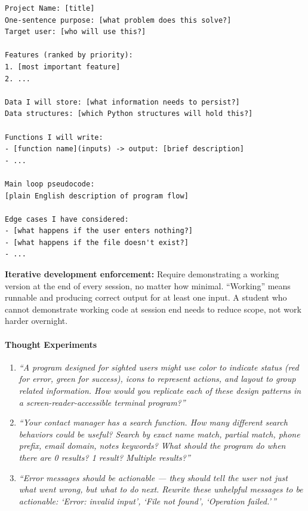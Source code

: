 \documentclass[
  justified,
  openright,
]{tufte-book}
\let\paragraph\paragraph
\let\paragraph\paragraph
\begin{document}
\begin{verbatim}
Project Name: [title]
One-sentence purpose: [what problem does this solve?]
Target user: [who will use this?]

Features (ranked by priority):
1. [most important feature]
2. ...

Data I will store: [what information needs to persist?]
Data structures: [which Python structures will hold this?]

Functions I will write:
- [function name](inputs) -> output: [brief description]
- ...

Main loop pseudocode:
[plain English description of program flow]

Edge cases I have considered:
- [what happens if the user enters nothing?]
- [what happens if the file doesn't exist?]
- ...
\end{verbatim}

\textbf{Iterative development enforcement:} Require demonstrating a
working version at the end of every session, no matter how minimal.
``Working'' means runnable and producing correct output for at least one
input. A student who cannot demonstrate working code at session end
needs to reduce scope, not work harder overnight.

\paragraph{Thought Experiments}\label{thought-experiments-17}

\begin{enumerate}
\def\labelenumi{\arabic{enumi}.}
\item
  \emph{``A program designed for sighted users might use color to
  indicate status (red for error, green for success), icons to represent
  actions, and layout to group related information. How would you
  replicate each of these design patterns in a screen-reader-accessible
  terminal program?''}
\item
  \emph{``Your contact manager has a search function. How many different
  search behaviors could be useful? Search by exact name match, partial
  match, phone prefix, email domain, notes keywords? What should the
  program do when there are 0 results? 1 result? Multiple results?''}
\item
  \emph{``Error messages should be actionable --- they should tell the
  user not just what went wrong, but what to do next. Rewrite these
  unhelpful messages to be actionable: `Error: invalid input', `File not
  found', `Operation failed.'\,''}
\end{enumerate}
\end{document}
